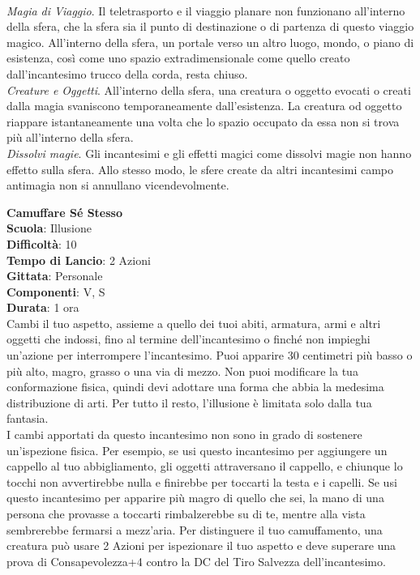 \begin{multicols}{2}
\\\textit{Magia di Viaggio}. Il teletrasporto e il viaggio planare non funzionano all'interno della sfera, che la sfera sia il punto di destinazione o di partenza di questo viaggio magico. All'interno della sfera, un portale verso un altro luogo, mondo, o piano di esistenza, così come uno spazio extradimensionale come quello creato dall'incantesimo trucco della corda, resta chiuso.
\\\textit{Creature e Oggetti}. All'interno della sfera, una creatura o oggetto evocati o creati dalla magia svaniscono temporaneamente dall'esistenza. La creatura od oggetto riappare istantaneamente una volta che lo spazio occupato da essa non si trova più all'interno della sfera.
\\\textit{Dissolvi magie}. Gli incantesimi e gli effetti magici come dissolvi magie non hanno effetto sulla sfera. Allo stesso modo, le sfere create da altri incantesimi campo antimagia non si annullano vicendevolmente. 

\medskip\textbf{Camuffare Sé Stesso}\\
\textbf{Scuola}: Illusione\\
\textbf{Difficoltà}: 10\\
\textbf{Tempo di Lancio}: 2 Azioni\\
\textbf{Gittata}: Personale\\
\textbf{Componenti}: V, S\\
\textbf{Durata}: 1 ora\\
Cambi il tuo aspetto, assieme a quello dei tuoi abiti, armatura, armi e altri oggetti che indossi, fino al termine dell'incantesimo o finché non impieghi un'azione per interrompere l'incantesimo. Puoi apparire 30 centimetri più basso o più alto, magro, grasso o una via di mezzo. Non puoi modificare la tua conformazione fisica, quindi devi adottare una forma che abbia la medesima distribuzione di arti. Per tutto il resto, l'illusione è limitata solo dalla tua fantasia.\\
I cambi apportati da questo incantesimo non sono in grado di sostenere un'ispezione fisica. Per esempio, se usi questo incantesimo per aggiungere un cappello al tuo abbigliamento, gli oggetti attraversano il cappello, e chiunque lo tocchi non avvertirebbe nulla e finirebbe per toccarti la testa e i capelli. Se usi questo incantesimo per apparire più magro di quello che sei, la mano di una persona che provasse a toccarti rimbalzerebbe su di te, mentre alla vista sembrerebbe fermarsi a mezz'aria. Per distinguere il tuo camuffamento, una creatura può usare 2 Azioni per ispezionare il tuo aspetto e deve superare una prova di Consapevolezza+4 contro la DC del Tiro Salvezza dell'incantesimo. 


\end{multicols}
